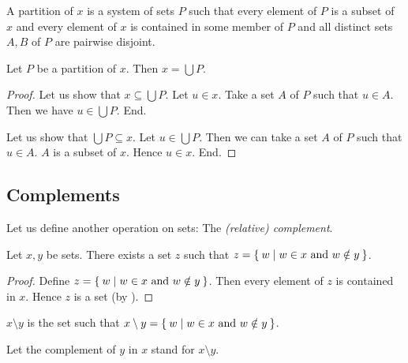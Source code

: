 \documentclass[../../set-theory.ftl.tex]{subfiles}
\begin{document}
  \begin{forthel}
    \begin{definition}
      A partition of $x$ is a system of sets $P$ such that every element of $P$ is a subset of $x$ and every element of $x$ is contained in some member of $P$ and all distinct sets $A,B$ of $P$ are pairwise disjoint.
    \end{definition}

    \begin{proposition}\label{SetTheory_01_01_493610}
      Let $P$ be a partition of $x$.
      Then $x = \bigcup P$.
    \end{proposition}
    \begin{proof}
      Let us show that $x \subseteq \bigcup P$.
        Let $u \in x$.
        Take a set $A$ of $P$ such that $u \in A$.
        Then we have $u \in \bigcup P$.
      End.

      Let us show that $\bigcup P \subseteq x$.
        Let $u \in \bigcup P$.
        Then we can take a set $A$ of $P$ such that $u \in A$.
        $A$ is a subset of $x$.
        Hence $u \in x$.
      End.
    \end{proof}
  \end{forthel}


  \subsection{Complements}

  \noindent Let us define another operation on sets: The \textit{(relative)
  complement}.

  \begin{forthel}
    \begin{lemma}
      Let $x,y$ be sets.
      There exists a set $z$ such that $z = \Set{w | \text{$w \in x$ and $w \notin y$}}$.
    \end{lemma}
    \begin{proof}
      Define $z = \Set{w | \text{$w \in x$ and $w \notin y$}}$.
      Then every element of $z$ is contained in $x$.
      Hence $z$ is a set (by ).
    \end{proof}

    \begin{definition}
      $x \setminus y$ is the set such that $x \setminus y = \Set{w | \text{$w \in x$ and $w \notin y$}}$.
    \end{definition}

    Let the complement of $y$ in $x$ stand for $x \setminus y$.
  \end{forthel}
\end{document}
